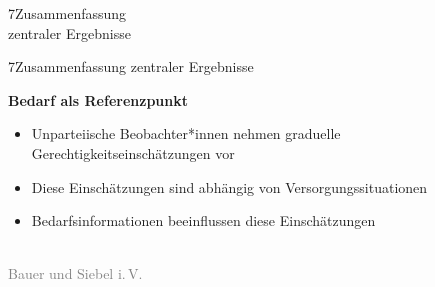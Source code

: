 \documentclass[xcolor=table,9pt,aspectratio=169]{beamer}
\begin{document}
\begin{frame}
\begin{overlayarea}{\textwidth}{0.81\paperheight}{
   \vspace*{11mm}
   \textcolor{uolblue}
   {7\hspace*{1em}Zusammenfassung\\\hspace*{1.5em}zentraler Ergebnisse}
}
\end{overlayarea}
\end{frame}


\begin{frame}{\vspace*{10mm}7\hspace*{1em}Zusammenfassung zentraler Ergebnisse}
\begin{multicols}{2}
   \textbf{Bedarf als Referenzpunkt}
   \begin{itemize}
   \item[(1)] Unparteiische Beobachter*innen nehmen graduelle Gerechtigkeitseinschätzungen vor
   \item[(2)] Diese Einschätzungen sind abhängig von Versorgungssituationen
   \item[(3)] Bedarfsinformationen beeinflussen diese Einschätzungen
\end{itemize}
   \vfill
   \begin{center}
      \\
      \footnotesize{\textcolor{gray}{Bauer und Siebel i.\,V.}}
   \end{center}
\end{multicols}
\end{frame}
\end{document}
